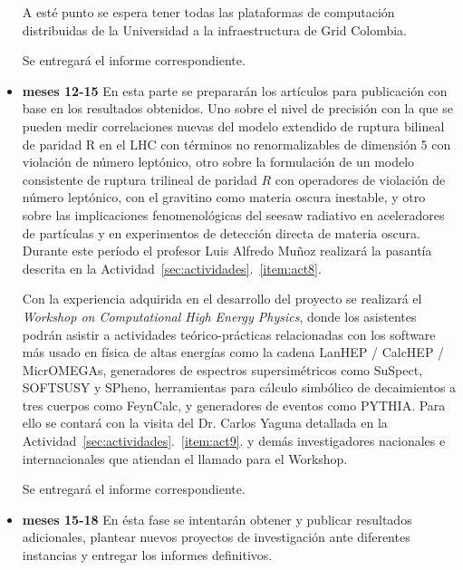 \begin{itemize}
  A esté punto se espera tener todas las plataformas de computación
  distribuidas de la Universidad a la infraestructura de Grid
  Colombia. 

  Se entregará el informe correspondiente.

\item \textbf{meses 12-15} En esta parte se prepararán los artículos
  para publicación con base en los resultados obtenidos. Uno sobre el
  nivel de precisión con la que se pueden medir correlaciones nuevas
  del modelo extendido de ruptura bilineal de paridad R en el LHC con
  términos no renormalizables de dimensión 5 con violación de número
  leptónico, otro sobre la formulación de un modelo consistente de
  ruptura trilineal de paridad $R$ con operadores de violación de
  número leptónico, con el gravitino como materia oscura inestable, y
  otro sobre las implicaciones fenomenológicas del seesaw radiativo en
  aceleradores de partículas y en experimentos de detección directa de
  materia oscura. Durante este período el profesor Luis Alfredo Muñoz
  realizará la pasantía descrita en la
  Actividad~\ref{sec:actividades}.~\ref{item:act8}. 

  Con la experiencia adquirida en el desarrollo del proyecto se
  realizará el \emph{Workshop on Computational High Energy Physics},
  donde los asistentes podrán asistir a actividades teórico-prácticas
  relacionadas con los software más usado en física de altas energías
  como la cadena LanHEP / CalcHEP / MicrOMEGAs, generadores de espectros
  supersimétricos como SuSpect, SOFTSUSY y SPheno, herramientas para
  cálculo simbólico de decaimientos a tres cuerpos como FeynCalc, y
  generadores de eventos como PYTHIA. Para ello se contará con la
  visita del Dr. Carlos Yaguna detallada en la
  Actividad~\ref{sec:actividades}.~\ref{item:act9}. y demás
  investigadores nacionales e internacionales que atiendan el llamado
  para el Workshop.

  Se entregará el informe correspondiente.
\item \textbf{meses 15-18}
  En ésta fase se intentarán obtener y publicar resultados
  adicionales, plantear nuevos proyectos de investigación ante
  diferentes instancias y entregar los informes definitivos.
\end{itemize}

